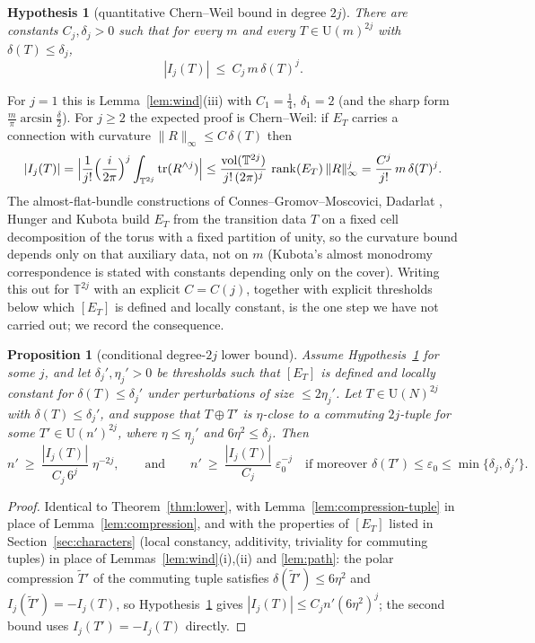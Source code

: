 \documentclass[11pt]{amsart}
\newtheorem{proposition}[theorem]{Proposition}
\newtheorem{hypothesis}[theorem]{Hypothesis}
\theoremstyle{definition}
\theoremstyle{remark}
\newcommand{\T}{\mathbb T}
\newcommand{\rank}{\operatorname{rank}}
\newcommand{\U}{\mathrm U}
\newcommand{\norm}[1]{\lVert #1\rVert}
\begin{document}
\begin{hypothesis}[quantitative Chern--Weil bound in degree $2j$]\label{hyp:cw}
There are constants $C_j,\delta_j>0$ such that for every $m$ and every $T\in\U(m)^{2j}$ with $\delta(T)\le\delta_j$,
\[
|I_j(T)|\ \le\ C_j\,m\,\delta(T)^j .
\]
\end{hypothesis}

For $j=1$ this is Lemma~\ref{lem:wind}(iii) with $C_1=\frac14$, $\delta_1=2$ (and the sharp form $\frac m\pi\arcsin\frac\delta2$). For $j\ge2$ the expected proof is Chern--Weil: if $E_T$ carries a connection with curvature $\norm{R}_\infty\le C\,\delta(T)$ then
\[
|I_j(T)|=\Bigl|\frac{1}{j!}\Bigl(\frac{i}{2\pi}\Bigr)^j\int_{\T^{2j}}\operatorname{tr}(R^{\wedge j})\Bigr|\le\frac{\operatorname{vol}(\T^{2j})}{j!\,(2\pi)^j}\,\rank(E_T)\,\norm{R}_\infty^j=\frac{C^j}{j!}\,m\,\delta(T)^j .
\]
The almost-flat-bundle constructions of Connes--Gromov--Moscovici, Dadarlat \cite{Dad12}, Hunger \cite{Hun19} and Kubota \cite{Kub19} build $E_T$ from the transition data $T$ on a fixed cell decomposition of the torus with a fixed partition of unity, so the curvature bound depends only on that auxiliary data, not on $m$ (Kubota's almost monodromy correspondence \cite{Kub19} is stated with constants depending only on the cover). Writing this out for $\T^{2j}$ with an explicit $C=C(j)$, together with explicit thresholds below which $[E_T]$ is defined and locally constant, is the one step we have not carried out; we record the consequence.

\begin{proposition}[conditional degree-$2j$ lower bound]\label{prop:deg4}
Assume Hypothesis~\ref{hyp:cw} for some $j$, and let $\delta_j',\eta_j'>0$ be thresholds such that $[E_T]$ is defined and locally constant for $\delta(T)\le\delta_j'$ under perturbations of size $\le2\eta_j'$. Let $T\in\U(N)^{2j}$ with $\delta(T)\le\delta_j'$, and suppose that $T\oplus T'$ is $\eta$-close to a commuting $2j$-tuple for some $T'\in\U(n')^{2j}$, where $\eta\le\eta_j'$ and $6\eta^2\le\delta_j$. Then
\[
n'\ \ge\ \frac{|I_j(T)|}{C_j\,6^j}\;\eta^{-2j},\qquad\text{and}\qquad n'\ \ge\ \frac{|I_j(T)|}{C_j}\;\varepsilon_0^{-j}\quad\text{if moreover }\delta(T')\le\varepsilon_0\le\min\{\delta_j,\delta_j'\}.
\]
\end{proposition}

\begin{proof}
Identical to Theorem~\ref{thm:lower}, with Lemma~\ref{lem:compression-tuple} in place of Lemma~\ref{lem:compression}, and with the properties of $[E_T]$ listed in Section~\ref{sec:characters} (local constancy, additivity, triviality for commuting tuples) in place of Lemmas~\ref{lem:wind}(i),(ii) and \ref{lem:path}: the polar compression $\tilde T'$ of the commuting tuple satisfies $\delta(\tilde T')\le6\eta^2$ and $I_j(\tilde T')=-I_j(T)$, so Hypothesis~\ref{hyp:cw} gives $|I_j(T)|\le C_jn'(6\eta^2)^j$; the second bound uses $I_j(T')=-I_j(T)$ directly.
\end{proof}
\end{document}
